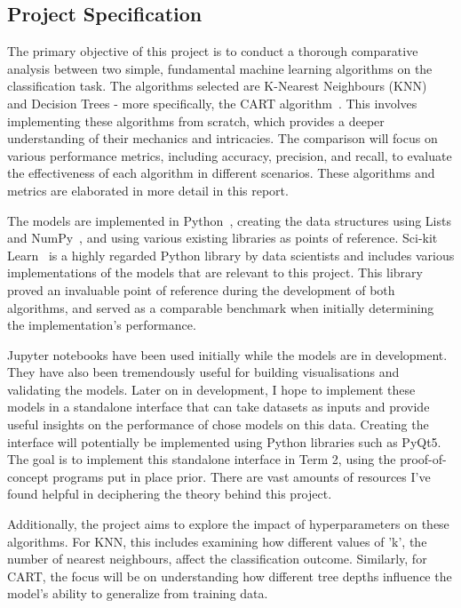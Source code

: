 \documentclass[letterpaper,10pt]{article}
\begin{document}
\newpage
\subsection{Project Specification}
The primary objective of this project is to conduct a thorough comparative analysis between two simple, fundamental machine learning algorithms on the classification task. The algorithms selected are K-Nearest Neighbours (KNN)~\cite{NNEFixHodges,NNCoverHart} and Decision Trees - more specifically, the CART algorithm~\cite{CARTBreiman}. This involves implementing these algorithms from scratch, which provides a deeper understanding of their mechanics and intricacies. The comparison will focus on various performance metrics, including accuracy, precision, and recall, to evaluate the effectiveness of each algorithm in different scenarios. These algorithms and metrics are elaborated in more detail in this report. \par
The models are implemented in Python~\cite{python3}, creating the data structures using Lists and NumPy~\cite{numpy}, and using various existing libraries as points of reference. Sci-kit Learn~\cite{scikit-learn} is a highly regarded Python library by data scientists and includes various implementations of the models that are relevant to this project. This library proved an invaluable point of reference during the development of both algorithms, and served as a comparable benchmark when initially determining the implementation's performance. \par
Jupyter notebooks have been used initially while the models are in development.
They have also been tremendously useful for building visualisations and
validating the models. Later on in development, I hope to implement these models
in a standalone interface that can take datasets as inputs and provide useful
insights on the performance of chose models on this data. Creating the interface
will potentially be implemented using Python libraries such as PyQt5. The goal is to implement this standalone interface in Term 2, using the proof-of-concept programs put in place prior. There are vast amounts of resources I’ve found helpful in deciphering the theory behind this project. \par
Additionally, the project aims to explore the impact of hyperparameters on these algorithms. For KNN, this includes examining how different values of 'k', the number of nearest neighbours, affect the classification outcome. Similarly, for CART, the focus will be on understanding how different tree depths influence the model's ability to generalize from training data.
\end{document}
